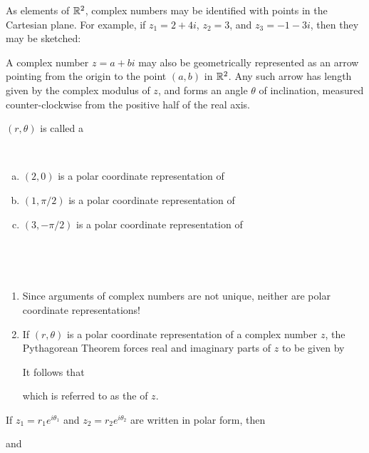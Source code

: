 \documentclass[11pt,fleqn,dvipsnames,usenames]{article}
\newcommand{\p}{\noindent}
\begin{document}
\p As elements of $\mathbb{R}^{2}$, complex numbers may be identified with points in the Cartesian plane.  For example, if $z_{1} = 2 + 4i$, $z_{2} = 3$, and $z_{3} = -1 -3i$, then they may be sketched:
\vfill

\p A complex number $z = a + bi$ may also be geometrically represented as an arrow pointing from the origin to the point $(a,b)$ in $\mathbb{R}^{2}$.  Any such arrow has length given by the complex modulus of $z$, and forms an angle $\theta$ of inclination, measured counter-clockwise from the positive half of the real axis.
\vfill

 $(r,\theta)$ is called a
\vsp

\begin{examples*}~
\begin{enumerate}[(a)]
\item $(2,0)$ is a polar coordinate representation of
\item $(1,\pi/2)$ is a polar coordinate representation of
\item $(3,-\pi/2)$ is a polar coordinate representation of
\end{enumerate}
\end{examples*}
\newpage

~
\vspace{4cm}


%
\begin{remarks}~
\begin{enumerate}[(1)]
\item Since arguments of complex numbers are not unique, neither are polar coordinate representations!
\vspace{3cm}

\item If $(r,\theta)$ is a polar coordinate representation of a complex number $z$, the Pythagorean Theorem forces real and imaginary parts of $z$ to be given by
\vspace{2cm}

\p It follows that
\vspace{2cm}

\p which is referred to as the  of $z$.
\end{enumerate}
\end{remarks}
\vsp

\observation If $z_{1} = r_{1}e^{i\theta_{1}}$ and $z_{2} = r_{2}e^{i\theta_{2}}$ are written in polar form, then
\vspace{2cm}

and
\vspace{2cm}
\vsp
\end{document}
